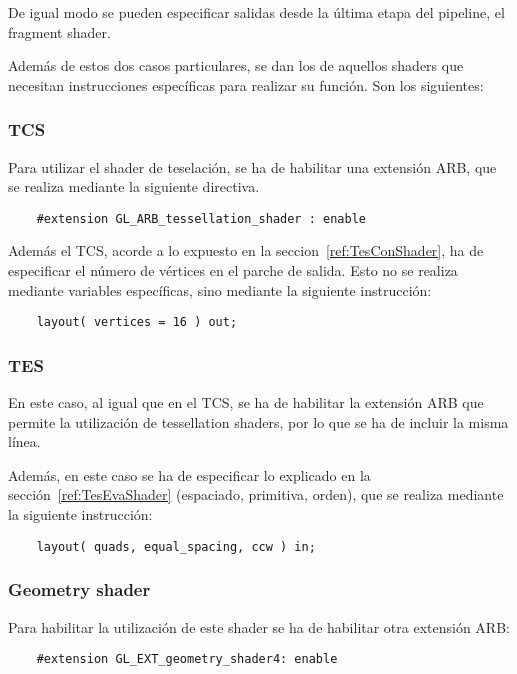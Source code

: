 De igual modo se pueden especificar salidas desde la última etapa del pipeline,
el fragment shader.

Además de estos dos casos particulares, se dan los de aquellos shaders que
necesitan instrucciones específicas para realizar su función. Son los
siguientes:

\subsubsection{TCS}

Para utilizar el shader de teselación, se ha de habilitar una extensión ARB, que
se realiza mediante la siguiente directiva.

\begin{verbatim}
    #extension GL_ARB_tessellation_shader : enable
\end{verbatim}

Además el TCS, acorde a lo expuesto en la seccion~\ref{ref:TesConShader}, ha de
especificar el número de vértices en el parche de salida. Esto no se realiza
mediante variables específicas, sino mediante la siguiente instrucción:

\begin{verbatim}
    layout( vertices = 16 ) out;
\end{verbatim}

\subsubsection{TES}

En este caso, al igual que en el TCS, se ha de habilitar la extensión ARB que
permite la utilización de tessellation shaders, por lo que se ha de incluir la
misma línea. 

Además, en este caso se ha de especificar lo explicado en la
sección~\ref{ref:TesEvaShader} (espaciado, primitiva, orden), que se realiza
mediante la siguiente instrucción:

\begin{verbatim}
    layout( quads, equal_spacing, ccw ) in;
\end{verbatim}

\subsubsection{Geometry shader}

Para habilitar la utilización de este shader se ha de habilitar otra extensión
ARB:

\begin{verbatim}
    #extension GL_EXT_geometry_shader4: enable
\end{verbatim}

